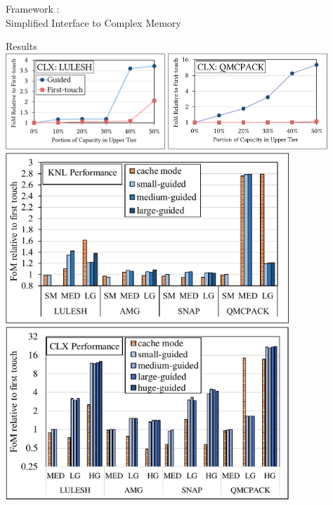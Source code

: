 \documentclass[final,hyperref={pdfpagelabels=false}]{beamer}
\begin{document}
\begin{frame}{}
\begin{columns}[t]
  \begin{column}{.45\linewidth}

    \begin{block}{Framework}
      :\\Simplified Interface to Complex Memory
      \begin{center}
        \resizebox{0.7\textwidth}{!}{%
          
        }%
      \end{center}%
    \end{block}

    \begin{block}{Results}
      \centering%
      \\
      \includegraphics[width=0.45\textwidth]{figures/clx_small_lulesh.pdf}
      \includegraphics[width=0.45\textwidth]{figures/clx_small_qmcpack.pdf}
      \includegraphics[width=0.8\textwidth]{figures/knl_perf.pdf}\\
      \vspace{1em}
      \includegraphics[width=0.8\textwidth]{figures/aep_perf.pdf}\\

\end{block}
\end{column}
\end{columns}
\end{frame}
\end{document}
